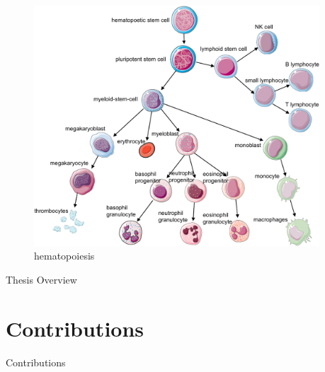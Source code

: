 \begin{figure}[!ht]
	\centering
	\includegraphics[width=0.95\textwidth]{blood/fig}
	\vspace{0.1cm}
	\caption[hematopoiesis cells differentiation tree]{hematopoiesis}
	\label{fig:hematopoiesis}
\end{figure}




Thesis Overview
\section{Contributions}
\label{introduction:sec3.contributions}

Contributions

